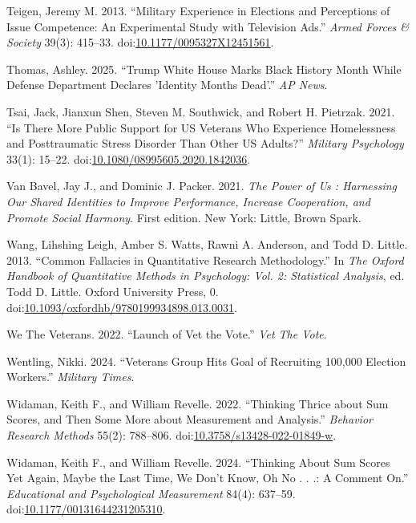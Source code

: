 \documentclass[
  12pt,
  letterpaper,
]{article}
\newlength{\cslhangindent}
\newenvironment{CSLReferences}[2] %
 {\begin{list}{}{%
  \setlength{\itemindent}{0pt}
  \setlength{\leftmargin}{0pt}
  \setlength{\parsep}{0pt}
  \ifodd #1
   \setlength{\leftmargin}{\cslhangindent}
   \setlength{\itemindent}{-1\cslhangindent}
  \fi
  \setlength{\itemsep}{#2\baselineskip}}}
 {\end{list}}
\begin{document}
\begin{CSLReferences}{1}{1}
Teigen, Jeremy M. 2013. {``Military {Experience} in {Elections} and
{Perceptions} of {Issue Competence}: {An Experimental Study} with
{Television Ads}.''} \emph{Armed Forces \& Society} 39(3): 415--33.
doi:\href{https://doi.org/10.1177/0095327X12451561}{10.1177/0095327X12451561}.

Thomas, Ashley. 2025. {``Trump {White House} Marks {Black History Month}
While {Defense Department} Declares 'Identity Months Dead'.''} \emph{AP
News}.

Tsai, Jack, Jianxun Shen, Steven M. Southwick, and Robert H. Pietrzak.
2021. {``Is There More Public Support for {US Veterans} Who Experience
Homelessness and Posttraumatic Stress Disorder Than Other {US}
Adults?''} \emph{Military Psychology} 33(1): 15--22.
doi:\href{https://doi.org/10.1080/08995605.2020.1842036}{10.1080/08995605.2020.1842036}.

Van Bavel, Jay J., and Dominic J. Packer. 2021. \emph{The Power of Us :
Harnessing Our Shared Identities to Improve Performance, Increase
Cooperation, and Promote Social Harmony}. First edition. New York:
Little, Brown Spark.

Wang, Lihshing Leigh, Amber S. Watts, Rawni A. Anderson, and Todd D.
Little. 2013. {``Common {Fallacies} in {Quantitative Research
Methodology}.''} In \emph{The {Oxford Handbook} of {Quantitative
Methods} in {Psychology}: {Vol}. 2: {Statistical Analysis}}, ed. Todd D.
Little. Oxford University Press, 0.
doi:\href{https://doi.org/10.1093/oxfordhb/9780199934898.013.0031}{10.1093/oxfordhb/9780199934898.013.0031}.

We The Veterans. 2022. {``Launch of {Vet} the {Vote}.''} \emph{Vet The
Vote}.

Wentling, Nikki. 2024. {``Veterans Group Hits Goal of Recruiting 100,000
Election Workers.''} \emph{Military Times}.

Widaman, Keith F., and William Revelle. 2022. {``Thinking Thrice about
Sum Scores, and Then Some More about Measurement and Analysis.''}
\emph{Behavior Research Methods} 55(2): 788--806.
doi:\href{https://doi.org/10.3758/s13428-022-01849-w}{10.3758/s13428-022-01849-w}.

Widaman, Keith F., and William Revelle. 2024. {``Thinking {About Sum
Scores Yet Again}, {Maybe} the {Last Time}, {We Don}'t {Know}, {Oh No} .
. .: {A Comment} On.''} \emph{Educational and Psychological Measurement}
84(4): 637--59.
doi:\href{https://doi.org/10.1177/00131644231205310}{10.1177/00131644231205310}.


\end{CSLReferences}
\end{document}
